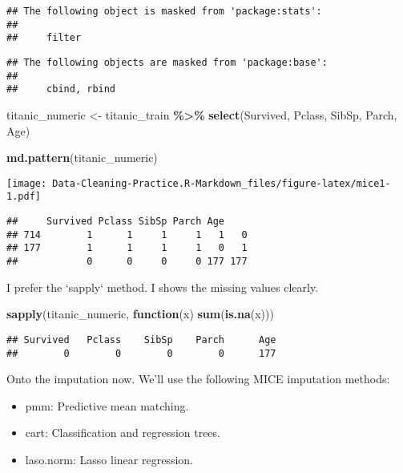 \documentclass[
]{article}
\newenvironment{Shaded}{\begin{snugshade}}{\end{snugshade}}
\newcommand{\ControlFlowTok}[1]{\textcolor[rgb]{0.13,0.29,0.53}{\textbf{#1}}}
\newcommand{\FunctionTok}[1]{\textcolor[rgb]{0.13,0.29,0.53}{\textbf{#1}}}
\newcommand{\NormalTok}[1]{#1}
\newcommand{\OtherTok}[1]{\textcolor[rgb]{0.56,0.35,0.01}{#1}}
\newcommand{\SpecialCharTok}[1]{\textcolor[rgb]{0.81,0.36,0.00}{\textbf{#1}}}
\providecommand{\tightlist}{%
  \setlength{\itemsep}{0pt}\setlength{\parskip}{0pt}}
\begin{document}
\begin{verbatim}
## The following object is masked from 'package:stats':
## 
##     filter
\end{verbatim}

\begin{verbatim}
## The following objects are masked from 'package:base':
## 
##     cbind, rbind
\end{verbatim}

\begin{Shaded}
\begin{Highlighting}[]
\NormalTok{titanic\_numeric }\OtherTok{\textless{}{-}}\NormalTok{ titanic\_train }\SpecialCharTok{\%\textgreater{}\%}
  \FunctionTok{select}\NormalTok{(Survived, Pclass, SibSp, Parch, Age)}

\FunctionTok{md.pattern}\NormalTok{(titanic\_numeric)}
\end{Highlighting}
\end{Shaded}

\texttt{[image: Data-Cleaning-Practice.R-Markdown\_files/figure-latex/mice1-1.pdf]}

\begin{verbatim}
##     Survived Pclass SibSp Parch Age    
## 714        1      1     1     1   1   0
## 177        1      1     1     1   0   1
##            0      0     0     0 177 177
\end{verbatim}

I prefer the `sapply` method. I shows the missing values clearly.

\begin{Shaded}
\begin{Highlighting}[]
\FunctionTok{sapply}\NormalTok{(titanic\_numeric, }\ControlFlowTok{function}\NormalTok{(x) }\FunctionTok{sum}\NormalTok{(}\FunctionTok{is.na}\NormalTok{(x)))}
\end{Highlighting}
\end{Shaded}

\begin{verbatim}
## Survived   Pclass    SibSp    Parch      Age 
##        0        0        0        0      177
\end{verbatim}

Onto the imputation now. We'll use the following MICE imputation
methods:

\begin{itemize}
\tightlist
\item
  pmm: Predictive mean matching.
\item
  cart: Classification and regression trees.
\item
  laso.norm: Lasso linear regression.
\end{itemize}
\end{document}
